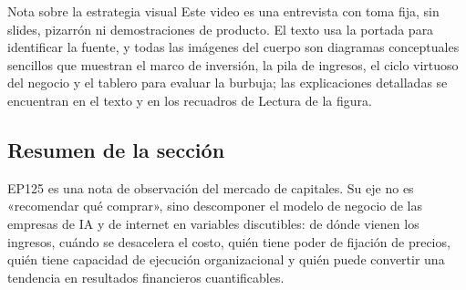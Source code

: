 \begin{knowledgebox}{Nota sobre la estrategia visual}
Este video es una entrevista con toma fija, sin slides, pizarrón ni demostraciones de producto. El texto usa la portada para identificar la fuente, y todas las imágenes del cuerpo son diagramas conceptuales sencillos que muestran el marco de inversión, la pila de ingresos, el ciclo virtuoso del negocio y el tablero para evaluar la burbuja; las explicaciones detalladas se encuentran en el texto y en los recuadros de Lectura de la figura.
\end{knowledgebox}

\subsection{Resumen de la sección}

EP125 es una nota de observación del mercado de capitales. Su eje no es «recomendar qué comprar», sino descomponer el modelo de negocio de las empresas de IA y de internet en variables discutibles: de dónde vienen los ingresos, cuándo se desacelera el costo, quién tiene poder de fijación de precios, quién tiene capacidad de ejecución organizacional y quién puede convertir una tendencia en resultados financieros cuantificables.

